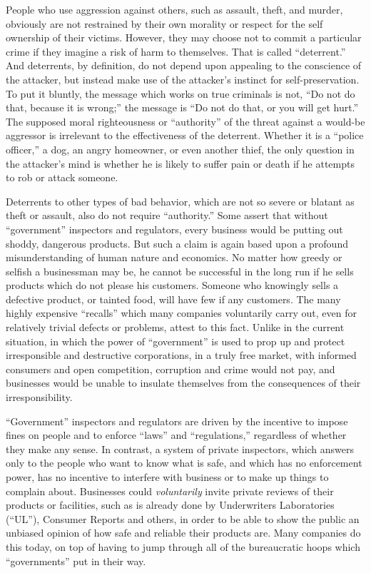 \documentclass{book}
\begin{document}
People who use aggression against others, such as assault, theft, and murder, obviously are not restrained by their own morality or respect for the self ownership of their victims. However, they may choose not to commit a particular crime if they imagine a risk of harm to themselves. That is called \enquote{deterrent.} And deterrents, by definition, do not depend upon appealing to the conscience of the attacker, but instead make use of the attacker's instinct for self-preservation. To put it bluntly, the message which works on true criminals is not, \enquote{Do not do that, because it is wrong;} the message is \enquote{Do not do that, or you will get hurt.} The supposed moral righteousness or \enquote{authority} of the threat against a would-be aggressor is irrelevant to the effectiveness of the deterrent. Whether it is a \enquote{police officer,} a dog, an angry homeowner, or even another thief, the only question in the attacker's mind is whether he is likely to suffer pain or death if he attempts to rob or attack someone.

Deterrents to other types of bad behavior, which are not so severe or blatant as theft or assault, also do not require \enquote{authority.} Some assert that without \enquote{government} inspectors and regulators, every business would be putting out shoddy, dangerous products. But such a claim is again based upon a profound misunderstanding of human nature and economics. No matter how greedy or selfish a businessman may be, he cannot be successful in the long run if he sells products which do not please his customers. Someone who knowingly sells a defective product, or tainted food, will have few if any customers. The many highly expensive \enquote{recalls} which many companies voluntarily carry out, even for relatively trivial defects or problems, attest to this fact. Unlike in the current situation, in which the power of \enquote{government} is used to prop up and protect irresponsible and destructive corporations, in a truly free market, with informed consumers and open competition, corruption and crime would not pay, and businesses would be unable to insulate themselves from the consequences of their irresponsibility.

\enquote{Government} inspectors and regulators are driven by the incentive to impose fines on people and to enforce \enquote{laws} and \enquote{regulations,} regardless of whether they make any sense. In contrast, a system of private inspectors, which answers only to the people who want to know what is safe, and which has no enforcement power, has no incentive to interfere with business or to make up things to complain about. Businesses could \emph{voluntarily} invite private reviews of their products or facilities, such as is already done by Underwriters Laboratories (\enquote{UL}), Consumer Reports and others, in order to be able to show the public an unbiased opinion of how safe and reliable their products are. Many companies do this today, on top of having to jump through all of the bureaucratic hoops which \enquote{governments} put in their way.
\end{document}
